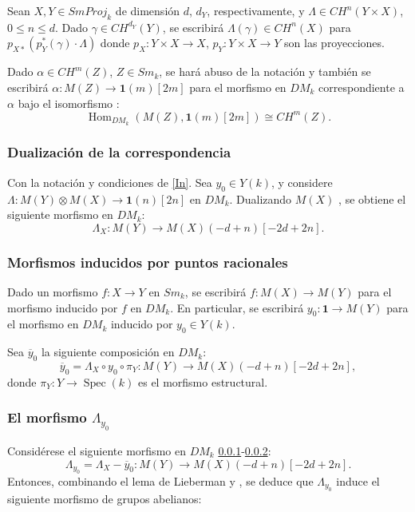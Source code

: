 \documentclass[10pt]{amsart}
\theoremstyle{definition}
\theoremstyle{remark}
\theoremstyle{definition}
\begin{document}
Sean $X, Y \in SmProj_{k}$ de dimensión $d$, $d_{Y}$, respectivamente, y $\Lambda \in CH^{n}(Y \times X)$, $0 \leq n \leq d$. Dado $\gamma \in CH^{d_{Y}}(Y)$, se escribirá $\Lambda(\gamma) \in CH^{n}(X)$ para $p_{X*}(p^{*}_{Y}(\gamma) \cdot \Lambda)$ donde $p_{X}: Y \times X \to X$, $p_{Y}: Y \times X \to Y$ son las proyecciones.

Dado $\alpha \in CH^{m}(Z)$, $Z \in Sm_{k}$, se hará abuso de la notación y también se escribirá $\alpha: M(Z) \to \mathbf{1}(m)[2m]$ para el morfismo en $DM_{k}$ correspondiente a $\alpha$ bajo el isomorfismo \cite{Voe02a}:
\[
\operatorname{Hom}_{DM_{k}}(M(Z), \mathbf{1}(m)[2m]) \cong CH^{m}(Z).
\]


\subsubsection{Dualización de la correspondencia}\label{In2}Con la notación y condiciones de \ref{In}. Sea $y_{0} \in Y(k)$, y considere $\Lambda: M(Y) \otimes M(X) \to \mathbf{1}(n)[2n]$ en $DM_{k}$. Dualizando $M(X)$ \cite[Thm. 4.3.7]{Voe00b}, \cite[Prop. 6.7.1 and §6.7.3]{BV08} se obtiene el siguiente morfismo en $DM_{k}$:
\[
\Lambda_{X}: M(Y) \to M(X)(-d + n)[-2d + 2n].
\]

\subsubsection{Morfismos inducidos por puntos racionales}\label{In3}
Dado un morfismo $f: X \to Y$ en $Sm_{k}$, se escribirá $f: M(X) \to M(Y)$ para el morfismo inducido por $f$ en $DM_{k}$. En particular, se escribirá $y_{0}: \mathbf{1} \to M(Y)$ para el morfismo en $DM_{k}$ inducido por $y_{0} \in Y(k)$.

Sea $\overline{y}_{0}$ la siguiente composición en $DM_{k}$:
\[
\overline{y}_{0} = \Lambda_{X} \circ y_{0} \circ \pi_{Y}: M(Y) \to M(X)(-d + n)[-2d + 2n],
\]
donde $\pi_{Y}: Y \to \operatorname{Spec}(k)$ es el morfismo estructural.

\subsubsection{El morfismo $\Lambda_{y_{0}}$}\label{In4} Considérese el siguiente morfismo en $DM_{k}$ \ref{In2}-\ref{In3}:
\[
\Lambda_{y_{0}} = \Lambda_{X} - \overline{y}_{0}: M(Y) \to M(X)(-d + n)[-2d + 2n].
\]
Entonces, combinando el lema de Lieberman \cite[Prop. 16.1.1]{Ful98} y \cite[Prop. 2.1.4, Thm. 3.2.6]{Voe00b}, se deduce que $\Lambda_{y_{0}}$ induce el siguiente morfismo de grupos abelianos:
\end{document}
